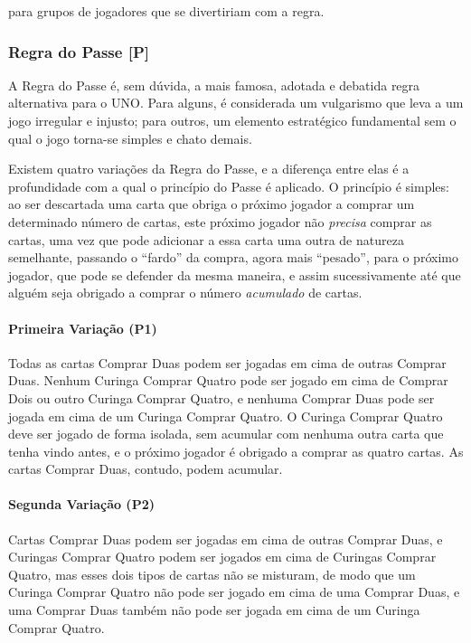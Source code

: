 para grupos de jogadores que se divertiriam com a regra.

\subsubsection{Regra do Passe [P]}

\label{regradopasse}

A Regra do Passe é, sem dúvida, a mais famosa, adotada e debatida regra alternativa para o UNO. Para alguns, é considerada um vulgarismo que leva a um jogo irregular e injusto; para outros, um elemento estratégico fundamental sem o qual o jogo torna-se simples e chato demais.

Existem quatro variações da Regra do Passe, e a diferença entre elas é a profundidade com a qual o princípio do Passe é aplicado. O princípio é simples: ao ser descartada uma carta que obriga o próximo jogador a comprar um determinado número de cartas, este próximo jogador não \emph{precisa} comprar as cartas, uma vez que pode adicionar a essa carta uma outra de natureza semelhante, passando o ``fardo'' da compra, agora mais ``pesado'', para o próximo jogador, que pode se defender da mesma maneira, e assim sucessivamente até que alguém seja obrigado a comprar o número \emph{acumulado} de cartas.

\paragraph{Primeira Variação (P1)} Todas as cartas Comprar Duas podem ser jogadas em cima de outras Comprar Duas. Nenhum Curinga Comprar Quatro pode ser jogado em cima de Comprar Dois ou outro Curinga Comprar Quatro, e nenhuma Comprar Duas pode ser jogada em cima de um Curinga Comprar Quatro. O Curinga Comprar Quatro deve ser jogado de forma isolada, sem acumular com nenhuma outra carta que tenha vindo antes, e o próximo jogador é obrigado a comprar as quatro cartas. As cartas Comprar Duas, contudo, podem acumular.

\paragraph{Segunda Variação (P2)} Cartas Comprar Duas podem ser jogadas em cima de outras Comprar Duas, e Curingas Comprar Quatro podem ser jogados em cima de Curingas Comprar Quatro, mas esses dois tipos de cartas não se misturam, de modo que um Curinga Comprar Quatro não pode ser jogado em cima de uma Comprar Duas, e uma Comprar Duas também não pode ser jogada em cima de um Curinga Comprar Quatro.

